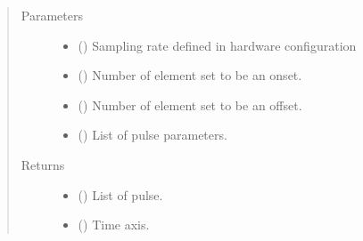 \documentclass[letterpaper,10pt,english]{sphinxmanual}
\begin{document}
\begin{fulllineitems}
\label{\detokenize{NoSeMazeController/PyPulse:PyPulse.PulseInterface.make_pulse}}
\pysigstartsignatures
{}
\pysigstopsignatures\begin{quote}\begin{description}
\item[{Parameters}] \leavevmode\begin{itemize}
\item {} 
\sphinxAtStartPar
{} () \textendash{} Sampling rate defined in hardware configuration

\item {} 
\sphinxAtStartPar
{} () \textendash{} Number of element set to be an onset.

\item {} 
\sphinxAtStartPar
{} () \textendash{} Number of element set to be an offset.

\item {} 
\sphinxAtStartPar
{} () \textendash{} List of pulse parameters.

\end{itemize}

\item[{Returns}] \leavevmode
\sphinxAtStartPar
\begin{itemize}
\item {} 
\sphinxAtStartPar
{} () \textendash{} List of pulse.

\item {} 
\sphinxAtStartPar
{} () \textendash{} Time axis.

\end{itemize}


\end{description}\end{quote}

\end{fulllineitems}
\end{document}
